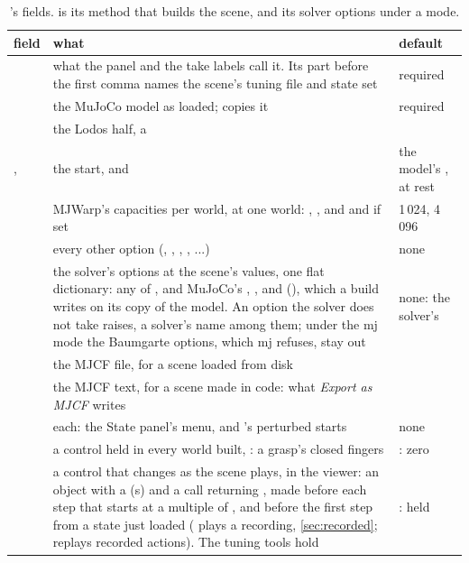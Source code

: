 \begin{table}[t]
\centering
\caption{'s fields.  is its method that builds the scene, and  its solver options under a mode.}
\label{tab:source}
\small
\begin{tabularx}{\linewidth}{@{}L{19mm}YL{38mm}@{}}
\toprule
field & what & default \\
\midrule
{} & what the panel and the take labels call it. Its part before the first comma names the scene's tuning file and state set & required \\
 & the MuJoCo model as loaded;  copies it & required \\
 & the Lodos half, a  &  \\
,  & the start,  and  & the model's , at rest \\
 & MJWarp's capacities per world, at one world: , , and  and  if set &  1\,024,  4\,096 \\
 & every other  option (, , , , ...) & none \\
 & the solver's options at the scene's values, one flat dictionary: any of , and MuJoCo's , ,  and  (), which a build writes on its copy of the model. An option the solver does not take raises, a solver's name among them; under the mj mode the Baumgarte options, which mj refuses, stay out & none: the solver's \\
 & the MJCF file, for a scene loaded from disk &  \\
 & the MJCF text, for a scene made in code: what \emph{Export as MJCF} writes &  \\
 &  each: the State panel's menu, and 's perturbed starts & none \\
 & a control held in every world built, : a grasp's closed fingers & : zero \\
 & a control that changes as the scene plays, in the viewer: an object with a  (s) and a call  returning , made before each step that starts at a multiple of , and before the first step from a state just loaded ( plays a recording, \cref{sec:recorded};  replays recorded actions). The tuning tools hold  & :  held \\

\end{tabularx}
\end{table}
